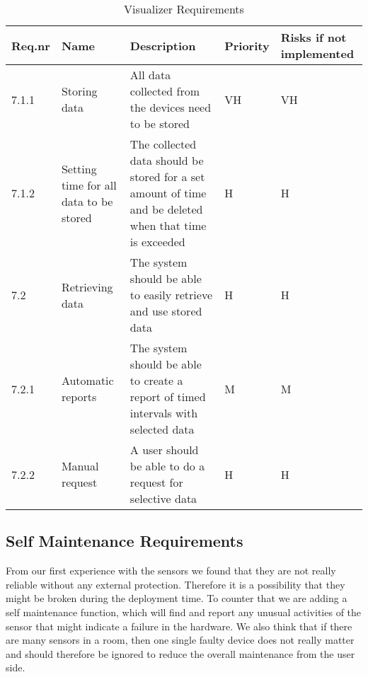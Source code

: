 \documentclass[../document]{subfiles}
\begin{document}
\begin{table}[H]
\caption{Visualizer Requirements}
\centering
\begin{tabularx}{\textwidth}{|l|X|X|l|X|}
\hline
Req.nr
&Name
&Description
&Priority
&Risks if not implemented
\\ \hline 7.1.1
&Storing data
&All data collected from the devices need to be stored
&VH
&VH
\\ \hline 7.1.2
&Setting time for all data to be stored
&The collected data should be stored for a set amount of time and be deleted when that time is exceeded
&H
&H
\\ \hline 7.2
&Retrieving data
&The system should be able to easily retrieve and use stored data
&H
&H
\\ \hline 7.2.1
&Automatic reports
&The system should be able to create a report of timed intervals with selected data
&M
&M
\\ \hline 7.2.2
&Manual request
&A user should be able to do a request for selective data
&H
&H
\\ \hline 
\end{tabularx}
\end{table}

\subsection{Self Maintenance Requirements}
From our first experience with the sensors we found that they are not really reliable without any external protection. Therefore it is a possibility that they might be broken during the deployment time. To counter that we are adding a self maintenance function, which will find and report any unusual activities of the sensor that might indicate a failure in the hardware. We also think that if there are many sensors in a room, then one single faulty device does not really matter and should therefore be ignored to reduce the overall maintenance from the user side.
\end{document}
